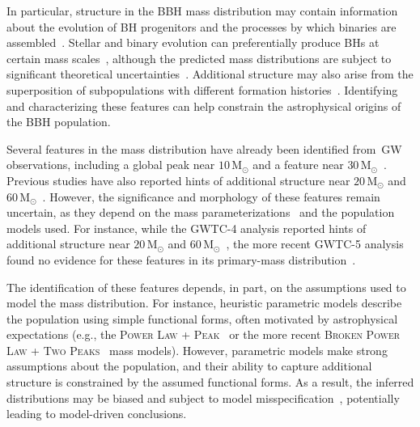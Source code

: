 \documentclass[twocolumn,twocolappendix,linenumbers]{aastex631}
\newcommand{\Msun}{\ensuremath{\mathrm{M}_\odot}\xspace}
\begin{document}
In particular, structure in the \ac{BBH} mass distribution may contain information about the evolution of \ac{BH} progenitors and the processes by which binaries are assembled~\citep{Mandel:2018hfr, vanSon:2022ylf}.
Stellar and binary evolution can preferentially produce \acp{BH} at certain mass scales~\citep{Stevenson:2019rcw,vanSon:2022myr}, although the predicted mass distributions are subject to significant theoretical uncertainties~\citep{Vink:2011is,Merritt:2025spl,Torniamenti:2025abq,2026arXiv260726147R}. Additional structure may also arise from the superposition of subpopulations with different formation histories~\citep[e.g.,][]{Mapelli:2020vfa,Ivanova:2012vx,Bavera:2020uch,Gerosa:2021mno,Mapelli:2019bnp,Mandel:2021smh,Zevin:2020gbd,Galaudage:2026opk}.
Identifying and characterizing these features can help constrain the astrophysical origins of the \ac{BBH} population.

Several features in the mass distribution have already been identified from~\ac{GW} observations, including a global peak near $10\,\Msun$ and a feature near $30\,\Msun$~\citep[e.g.,][]{LIGOScientific:2020kqk,KAGRA:2021duu,LIGOScientific:2026ctl,Edelman:2021zkw,Edelman:2022ydv,Farah:2023vsc,Godfrey:2023oxb,Rinaldi:2021bhm}.
Previous studies have also reported hints of additional structure near $20\,\Msun$ and $60\,\Msun$~\citep{Tiwari:2020otp,Edelman:2022ydv,Tiwari:2021yvr,MaganaHernandez:2024qkz,Gennari:2025nho,Pierra:2026ffj}.
However, the significance and morphology of these features remain uncertain, as they depend on the mass parameterizations~\citep[e.g.,][]{Tiwari:2023xff} and the population models used.
For instance, while the \ac{GWTC-4} analysis reported hints of additional structure near $20\,\Msun$ and $60\,\Msun$~\citep{LIGOScientific:2025pvj}, the more recent \ac{GWTC-5} analysis found no evidence for these features in its primary-mass distribution~\citep{LIGOScientific:2026ctl}.

The identification of these features depends, in part, on the assumptions used to model the mass distribution.
For instance, heuristic parametric models describe the population using simple functional forms, often motivated by astrophysical expectations (e.g., the \textsc{Power Law + Peak}~\citep{Talbot:2018cva} or the more recent \textsc{Broken Power Law + Two Peaks}~\citep{LIGOScientific:2025pvj,LIGOScientific:2026ctl} mass models).
However, parametric models make strong assumptions about the population, and their ability to capture additional structure is constrained by the assumed functional forms.
As a result, the inferred distributions may be biased and subject to model misspecification~\citep{Romero-Shaw:2022ctb,Cheng:2023ddt}, potentially leading to model-driven conclusions.
\end{document}
